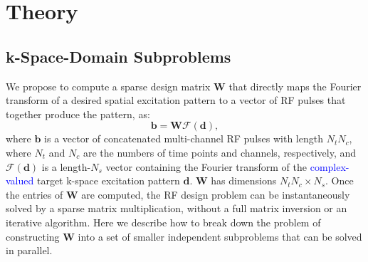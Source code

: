 \section*{Theory}

\subsection*{k-Space-Domain Subproblems}
We propose to compute a sparse 
design matrix $\bm{W}$ that directly maps the Fourier transform of a desired spatial 
excitation pattern to a vector of RF pulses that together produce the pattern, as:
\begin{equation}
\bm{b} = \bm{W} \mathcal{F}(\bm{d}),
\end{equation}
where $\bm{b}$ is a vector of concatenated multi-channel RF pulses with length $N_t  N_c$, 
where $N_t$ and $N_c$ are the numbers of time points and channels, respectively,
and $\mathcal{F}(\bm{d})$ is a length-$N_s$ vector containing the 
Fourier transform of the \textcolor{blue}{complex-valued} target k-space excitation pattern $\bm{d}$.
$\bm{W}$ has dimensions $N_t  N_c \times N_s$.
Once the entries of $\bm{W}$ are computed, 
the RF design problem can be instantaneously solved by a sparse matrix multiplication, 
without a full matrix inversion or an iterative algorithm. 
Here we describe how to break down the problem of constructing $\bm{W}$ 
into a set of smaller independent subproblems that can be solved in parallel. 


